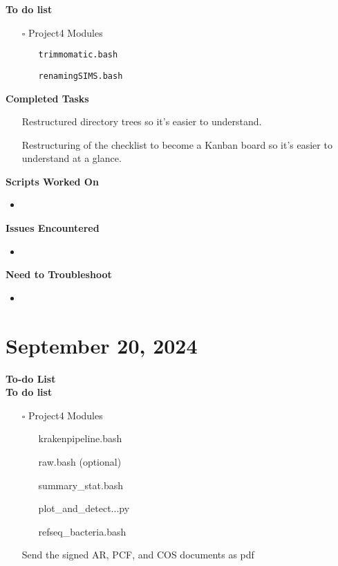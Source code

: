 \documentclass[11pt]{report}
\newcommand{\done}{\checkmark}
\newcommand{\pending}{$\square$}
\begin{document}
{\textbf{To do list}
\begin{itemize}
	\item [\pending] Project4 Modules
	\begin{itemize}
		\item [\done] \texttt{trimmomatic.bash}
		\item [\done] \texttt{renamingSIMS.bash}
	\end{itemize}
\end{itemize}

\textbf{Completed Tasks} 
\begin{itemize}
	\item [\done] Restructured directory trees so it's easier to understand. 
	\item [\done] Restructuring of the checklist to become a Kanban board so it's easier to understand at a glance.
\end{itemize}

\textbf{Scripts Worked On}
\begin{itemize}
	\item 
\end{itemize}


\textbf{Issues Encountered}
\begin{itemize}
	\item  
\end{itemize}

\textbf{Need to Troubleshoot}
\begin{itemize}
	\item 
\end{itemize}

\newpage

\newpage
\section{September 20, 2024}
\textbf{To-do List} \\


\textbf{To do list}
	\begin{itemize}
		\item [\pending] Project4 Modules
			\begin{itemize}
				\item [\done] krakenpipeline.bash
				\item [\done] raw.bash (optional)
				\item [\done] summary\_stat.bash
				\item [\done] plot\_and\_detect...py
				\item [\done] refseq\_bacteria.bash 
			\end{itemize}
		\item [\done] Send the signed AR, PCF, and COS documents as pdf
	\end{itemize}

}
\end{document}
